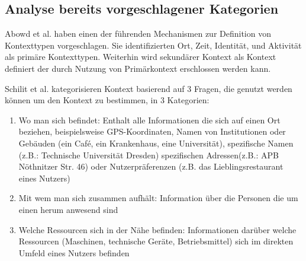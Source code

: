\subsection{ Analyse bereits vorgeschlagener Kategorien} 
Abowd et al.\cite{abowd_towards_1999} haben einen der führenden Mechanismen zur Definition von Kontexttypen vorgeschlagen. Sie identifizierten Ort, Zeit, Identität, und Aktivität als primäre Kontexttypen. Weiterhin wird sekundärer Kontext als Kontext definiert der durch Nutzung von Primärkontext erschlossen werden kann.

Schilit et al. \cite{schilit_context-aware_1994} kategorisieren Kontext basierend auf 3 Fragen, die genutzt werden können um den Kontext zu bestimmen, in 3 Kategorien:
\begin{enumerate}
\item{Wo man sich befindet: Enthalt alle Informationen die sich auf einen Ort beziehen, beispielsweise GPS-Koordinaten, Namen von Institutionen oder Gebäuden (ein Café, ein Krankenhaus, eine Universität), spezifische Namen (z.B.: Technische Universität Dresden) spezifischen Adressen(z.B.: APB Nöthnitzer Str. 46) oder Nutzerpräferenzen (z.B. das Lieblingsrestaurant eines Nutzers) }
\item{Mit wem man sich zusammen aufhält: Information über die Personen die um einen herum anwesend sind}
\item{Welche Ressourcen sich in der Nähe befinden: Informationen darüber welche Ressourcen (Maschinen, technische Geräte, Betriebsmittel) sich im direkten Umfeld eines Nutzers befinden}
\end{enumerate}

